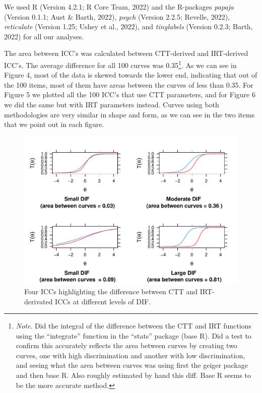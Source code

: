 \documentclass[
  man]{apa6}
\begin{document}
We used R (Version 4.2.1; R Core Team, 2022) and the R-packages \emph{papaja} (Version 0.1.1; Aust \& Barth, 2022), \emph{psych} (Version 2.2.5; Revelle, 2022), \emph{reticulate} (Version 1.25; Ushey et al., 2022), and \emph{tinylabels} (Version 0.2.3; Barth, 2022) for all our analyses.

The area between ICC's was calculated between CTT-derived and IRT-derived ICC's. The average difference for all 100 curves was 0.35\footnote{\emph{Note}. Did the integral of the difference between the CTT and IRT functions using the ``integrate'' function in the ``stats'' package (base R). Did a test to confirm this accurately reflects the area between curves by creating two curves, one with high discrimination and another with low discrimination, and seeing what the area between curves was using first the geiger package and then base R. Also roughly estimated by hand this diff. Base R seems to be the more accurate method.}. As we can see in Figure 4, most of the data is skewed towards the lower end, indicating that out of the 100 items, most of them have areas between the curves of less than 0.35.
For Figure 5 we plotted all the 100 ICC's that use CTT parameters, and for Figure 6 we did the same but with IRT parameters instead. Curves using both methodologies are very similar in shape and form, as we can see in the two items that we point out in each figure.

\begin{figure}
\centering
\includegraphics{ICC_project_files/figure-latex/plotting-1.pdf}
\caption{\label{fig:plotting}Four ICCs highlighting the difference between CTT and IRT-derivated ICCs at different levels of DIF.}
\end{figure}
\end{document}
